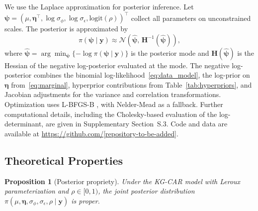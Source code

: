 \documentclass[12pt]{article}
\newtheorem{proposition}{Proposition}
\begin{document}
We use the Laplace approximation \citep{tierney1986accurate} for posterior inference. Let $\boldsymbol{\psi} = (\mu, \boldsymbol{\eta}^\top, \log \sigma_\phi, \log \sigma_\epsilon, \text{logit}(\rho))^\top$ collect all parameters on unconstrained scales. The posterior is approximated by
\begin{equation}
\label{eq:laplace}
\pi(\boldsymbol{\psi} \mid \mathbf{y}) \approx \mathcal{N}\!\left(\hat{\boldsymbol{\psi}},\, \mathbf{H}^{-1}(\hat{\boldsymbol{\psi}})\right),
\end{equation}
where $\hat{\boldsymbol{\psi}} = \arg\min_{\boldsymbol{\psi}} \{-\log \pi(\boldsymbol{\psi} \mid \mathbf{y})\}$ is the posterior mode and $\mathbf{H}(\hat{\boldsymbol{\psi}})$ is the Hessian of the negative log-posterior evaluated at the mode. The negative log-posterior combines the binomial log-likelihood~\eqref{eq:data_model}, the log-prior on $\boldsymbol{\eta}$ from~\eqref{eq:marginal}, hyperprior contributions from Table~\ref{tab:hyperpriors}, and Jacobian adjustments for the variance and correlation transformations. Optimization uses L-BFGS-B \citep[SciPy~1.14;][]{virtanen2020scipy}, with Nelder-Mead as a fallback. Further computational details, including the Cholesky-based evaluation of the log-determinant, are given in Supplementary Section~S.3. Code and data are available at \url{https://github.com/[repository-to-be-added]}.

\subsection{Theoretical Properties}
\label{sec:theory}

\begin{proposition}[Posterior propriety]
\label{prop:propriety}
Under the KG-CAR model with Leroux parameterization and $\rho \in [0, 1)$, the joint posterior distribution $\pi(\mu, \boldsymbol{\eta}, \sigma_\phi, \sigma_\epsilon, \rho \mid \mathbf{y})$ is proper.
\end{proposition}
\end{document}
